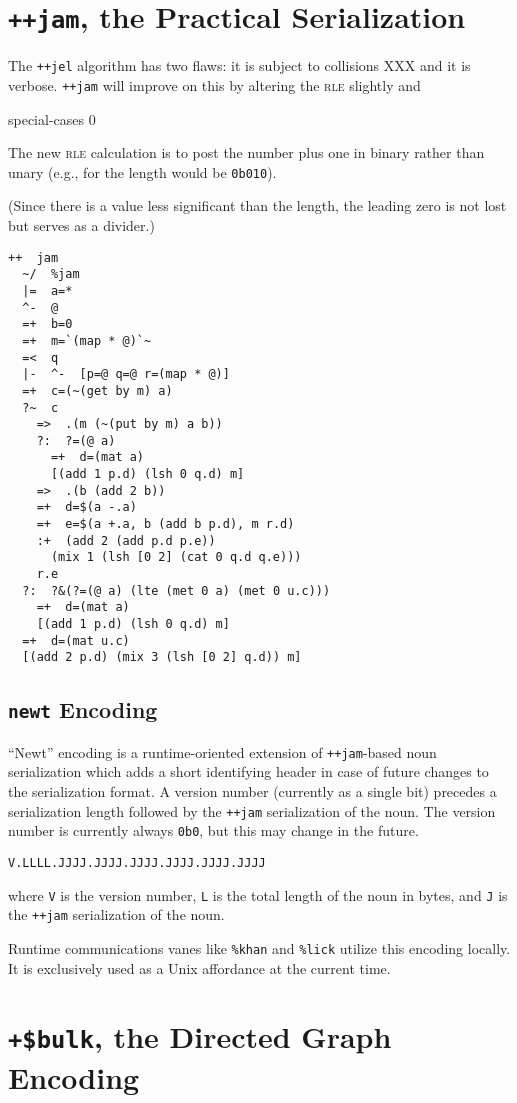 \documentclass[twoside]{article}
\begin{document}
\section{\texttt{++jam}, the Practical Serialization}

The \texttt{++jel} algorithm has two flaws:  it is subject to collisions XXX
and it is verbose.  \texttt{++jam} will improve on this by altering the \textsc{rle} slightly and

special-cases 0

The new \textsc{rle} calculation is to post the number plus one in binary rather than unary (e.g., for \texttt{} the length would be \texttt{0b010}).

(Since there is a value less significant than the length, the leading zero is not lost but serves as a divider.)

\begin{lstlisting}[style=listingcode]
++  jam
  ~/  %jam
  |=  a=*
  ^-  @
  =+  b=0
  =+  m=`(map * @)`~
  =<  q
  |-  ^-  [p=@ q=@ r=(map * @)]
  =+  c=(~(get by m) a)
  ?~  c
    =>  .(m (~(put by m) a b))
    ?:  ?=(@ a)
      =+  d=(mat a)
      [(add 1 p.d) (lsh 0 q.d) m]
    =>  .(b (add 2 b))
    =+  d=$(a -.a)
    =+  e=$(a +.a, b (add b p.d), m r.d)
    :+  (add 2 (add p.d p.e))
      (mix 1 (lsh [0 2] (cat 0 q.d q.e)))
    r.e
  ?:  ?&(?=(@ a) (lte (met 0 a) (met 0 u.c)))
    =+  d=(mat a)
    [(add 1 p.d) (lsh 0 q.d) m]
  =+  d=(mat u.c)
  [(add 2 p.d) (mix 3 (lsh [0 2] q.d)) m]
\end{lstlisting}


\subsection{\texttt{newt} Encoding}

“Newt” encoding is a runtime-oriented extension of \texttt{++jam}-based noun serialization which adds a short identifying header in case of future changes to the serialization format.  A version number (currently as a single bit) precedes a serialization length followed by the \texttt{++jam} serialization of the noun.  The version number is currently always \texttt{0b0}, but this may change in the future.

\begin{lstlisting}[style=listingcode]
  V.LLLL.JJJJ.JJJJ.JJJJ.JJJJ.JJJJ.JJJJ
\end{lstlisting}

\noindent{}
where \texttt{V} is the version number, \texttt{L} is the total length of the noun in bytes, and \texttt{J} is the \texttt{++jam} serialization of the noun.

Runtime communications vanes like \texttt{\%khan} and \texttt{\%lick} utilize this encoding locally.  It is exclusively used as a Unix affordance at the current time.

\section{\texttt{+\$bulk}, the Directed Graph Encoding}
\end{document}
